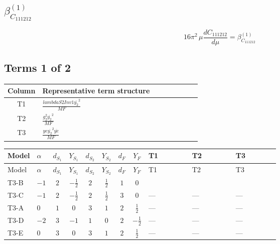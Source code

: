 \documentclass[8pt]{article}
\begin{document}
\begin{landscape}
\section*{$\beta_{C_{111212}}^{(1)}$}
\[16\pi^2\,\mu\frac{d C_{111212}}{d\mu}=\beta_{C_{111212}}^{(1)}\]
\subsection*{Terms 1 of 2}
\begin{center}
\begin{tabular}{@{}c >{\raggedright\arraybackslash}p{0.82\linewidth}@{}}
\toprule
Column & Representative term structure \\
\midrule
T1 & \(\displaystyle \frac{lambdaS2Inv1 \overline{y_{2}}^{2}}{MF}\) \\
\midrule
T2 & \(\displaystyle \frac{g_{2}^{2} \overline{y_{2}}^{2}}{MF}\) \\
\midrule
T3 & \(\displaystyle \frac{ye \overline{y_{2}}^{2} \overline{ye}}{MF}\) \\
\midrule
\bottomrule
\end{tabular}
\end{center}
\smallskip
\tiny
\begin{longtable}{@{}llcccccc >{\raggedright\arraybackslash}p{0.21\linewidth} >{\raggedright\arraybackslash}p{0.21\linewidth} >{\raggedright\arraybackslash}p{0.21\linewidth}@{}}
\toprule
Model & $\alpha$ & $d_{S_1}$ & $Y_{S_1}$ & $d_{S_2}$ & $Y_{S_2}$ & $d_F$ & $Y_F$ & T1 & T2 & T3 \\
\midrule
\endfirsthead
\toprule
Model & $\alpha$ & $d_{S_1}$ & $Y_{S_1}$ & $d_{S_2}$ & $Y_{S_2}$ & $d_F$ & $Y_F$ & T1 & T2 & T3 \\
\midrule
\endhead
T3-B & $-1$ & $2$ & $-\frac{1}{2}$ & $2$ & $\frac{1}{2}$ & $1$ & $0$ & \scriptsize\adjustbox{max width=\linewidth}{$\begin{gathered} \frac{lambdaS2Inv1 \overline{y_{2}}^{2}}{2 MF}\end{gathered}$} & \scriptsize\adjustbox{max width=\linewidth}{$\begin{gathered} \frac{3 g_{2}^{2} \overline{y_{2}}^{2}}{4 MF}\end{gathered}$} & \scriptsize\adjustbox{max width=\linewidth}{$\begin{gathered} - \frac{ye \overline{y_{2}}^{2} \overline{ye}}{4 MF}\end{gathered}$} \\
\midrule
T3-C & $-1$ & $2$ & $-\frac{1}{2}$ & $2$ & $\frac{1}{2}$ & $3$ & $0$ & --- & --- & --- \\
\midrule
T3-A & $0$ & $1$ & $0$ & $3$ & $1$ & $2$ & $\frac{1}{2}$ & --- & --- & --- \\
\midrule
T3-D & $-2$ & $3$ & $-1$ & $1$ & $0$ & $2$ & $-\frac{1}{2}$ & --- & --- & --- \\
\midrule
T3-E & $0$ & $3$ & $0$ & $3$ & $1$ & $2$ & $\frac{1}{2}$ & --- & --- & --- \\
\midrule
\bottomrule
\end{longtable}
\clearpage

\end{landscape}
\end{document}

